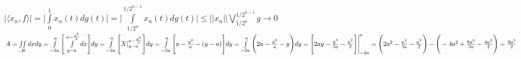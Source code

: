 \documentclass{article}
\begin{document}
$|\langle x_n, f\rangle|=\bigg| \int\limits_0^1 x_n(t)dg(t)\bigg|=\bigg| \int\limits_{1/2^n}^{1/2^{n-1}} x_n(t)dg(t)\bigg|\leq||x_n|| {\bigvee\limits_{1/2^n}^{1/2^{n-1}} g\rightarrow0}$
\hfill \break 
\hfill \break
\hfill \break
\hfill \break
\hfill \break
$A= \iint\limits\limits_{..R} dxdy=\int\limits_{-2a}^a\Bigg[\int\limits_{y-a}^{a-\frac{y^2}{a}} dx\Bigg]dy=\int\limits_{-2a}^a\Bigg[X|_{y-a}^{a-\frac{y^2}{a}}\Bigg]dy=\int\limits_{-2a}^a\Bigg[a-\frac{y^2}{a}-(y-a)\Bigg]dy=\int\limits_{-2a}^a\Bigg(2a-\frac{y^2}{a}-y\Bigg)dy=\Bigg[2ay-\frac{y^3}{3a}-\frac{y^2}{2}\Bigg]\Bigg|_{-2a}^a=\Bigg(2a^2-\frac{a^3}{3a}-\frac{a^2}{2}\Bigg)-\Bigg(-4a^2+\frac{8a^3}{3a}-\frac{4a^2}{2}\Bigg)=\frac{9a^2}{2}$
\end{document}
